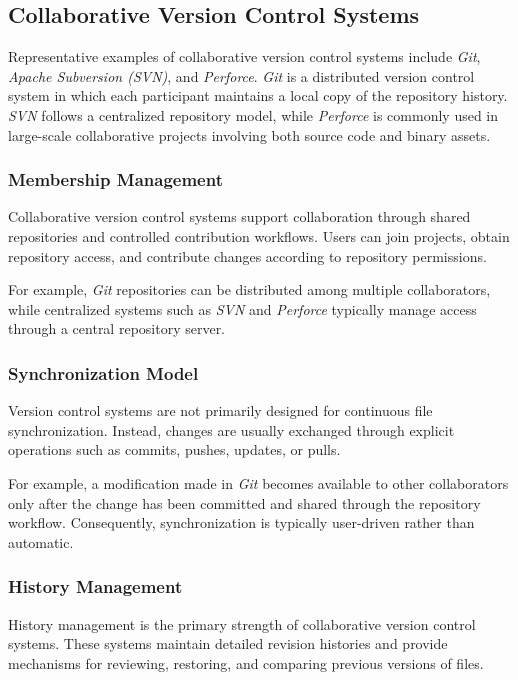 \subsection{Collaborative Version Control Systems}

Representative examples of collaborative version control
systems include \textit{Git}, \textit{Apache Subversion (SVN)},
and \textit{Perforce}. \textit{Git} is a distributed version
control system in which each participant maintains a local copy
of the repository history. \textit{SVN} follows a centralized
repository model, while \textit{Perforce} is commonly used in
large-scale collaborative projects involving both source code
and binary assets.

\subsubsection{Membership Management}

Collaborative version control systems support collaboration
through shared repositories and controlled contribution
workflows. Users can join projects, obtain repository access,
and contribute changes according to repository permissions.

For example, \textit{Git} repositories can be distributed among
multiple collaborators, while centralized systems such as
\textit{SVN} and \textit{Perforce} typically manage access
through a central repository server.

\subsubsection{Synchronization Model}

Version control systems are not primarily designed for
continuous file synchronization. Instead, changes are usually
exchanged through explicit operations such as commits, pushes,
updates, or pulls.

For example, a modification made in \textit{Git} becomes
available to other collaborators only after the change has
been committed and shared through the repository workflow.
Consequently, synchronization is typically user-driven rather
than automatic.

\subsubsection{History Management}

History management is the primary strength of collaborative
version control systems. These systems maintain detailed
revision histories and provide mechanisms for reviewing,
restoring, and comparing previous versions of files.

